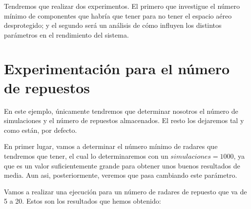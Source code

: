 \documentclass[11pt,a4paper]{report}
\begin{document}
Tendremos que realizar dos experimentos. El primero que investigue el número mínimo de componentes que habría que tener para no
tener el espacio aéreo desprotegido; y el segundo será un análisis de cómo influyen los distintos parámetros en el rendimiento del
sistema.


\section{Experimentación para el número de repuestos}

En este ejemplo, únicamente tendremos que determinar nosotros el número de simulaciones y el número de repuestos almacenados. El
resto los dejaremos tal y como están, por defecto.

En primer lugar, vamos a determinar el número mínimo de radares que tendremos que tener, el cual lo determinaremos con un $simulaciones
=1000$, ya que es un valor suficientemente grande para obtener unos buenos resultados de media. Aun asi, posteriormente, veremos que
pasa cambiando este parámetro.

Vamos a realizar una ejecución para un número de radares de repuesto que va de 5 a 20. Estos son los resultados que hemos obtenido:

\begin{table}[H]
\centering
{}
\end{table}
\end{document}
